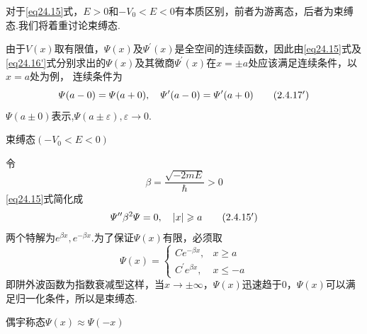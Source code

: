 对于\eqref{eq24.15}式，$E>0$和$-V_{0}<E<0$有本质区别，前者为游离态，后者为束缚态.我们将着重讨论束缚态.

由于$V(x)$取有限值，$\varPsi(x)$及$\varPsi^{\prime}(x)$是全空间的连续函数，因此由\eqref{eq24.15}式及\eqref{eq24.16'}式分别求出的$\varPsi(x)$及其微商$\varPsi^{\prime}(x)$在$x=\pm a$处应该满足连续条件，以$x=a$处为例， 连续条件为
\setlength{\mathindent}{5em}
\begin{equation*}\label{eq24.17'}
	\varPsi(a-0)=\varPsi(a+0),\quad \varPsi^{\prime}(a-0)=\varPsi^{\prime}(a+0)
	\tag{$2.4.17^{\prime}$}
\end{equation*}\eqnormal
$\varPsi(a\pm 0)$表示,$\varPsi(a\pm\varepsilon),\varepsilon\rightarrow 0$.

{\heiti 束缚态$(-V_{0}<E<0)$}

令
\begin{equation}\label{eq24.18}
	\beta=\frac{\sqrt{-2mE}}{\hbar}>0
\end{equation}
\eqref{eq24.15}式简化成
\begin{equation*}\label{eq24.15'}
	\varPsi^{\prime\prime}\-\beta^{2}\varPsi=0,\quad |x|\geqslant a	\tag{$2.4.15^{\prime}$}
\end{equation*}
两个特解为$e^{\beta x},e^{-\beta x}$.为了保证$\varPsi(x)$有限，必须取
\begin{equation}\label{eq24.19}
	\varPsi(x)=
	\begin{cases}
		Ce^{-\beta x},  & x\geqslant a 		\\
		C^{\prime}e^{\beta x},	& x\leqslant -a
	\end{cases}
\end{equation}
即阱外波函数为指数衰减型这样，当$x\rightarrow\pm\infty$，$\varPsi(x)$迅速趋于0，$ \varPsi(x) $可以满足归一化条件，所以是束缚态.

{\heiti 偶宇称态}$\varPsi(x)\approx\varPsi(-x)$

